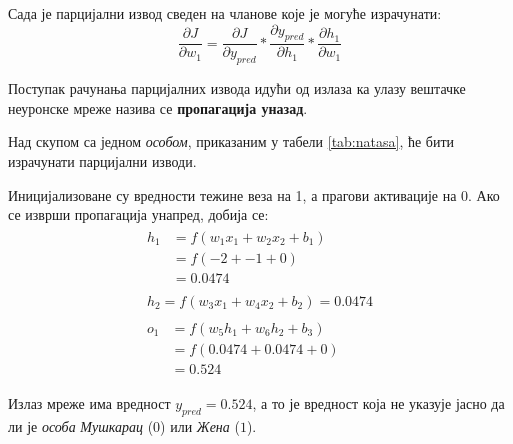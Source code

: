 \documentclass[12pt, а4paper]{article}
\begin{document}
Сада је парцијални извод сведен на чланове које је могуће израчунати:
\begin{equation}
\frac{\partial J}{\partial w_1} = \frac{\partial J}{\partial y_{pred}} * \frac{\partial y_{pred}}{\partial h_1} * \frac{\partial h_1}{\partial w_1}
\end{equation}

Поступак рачунања парцијалних извода идући од излаза ка улазу
вештачке неуронске мреже
назива се \textbf{пропагација уназад}.

Над скупом са једном \textit{особом}, приказаним у табели \ref{tab:natasa},
ће бити израчунати парцијални изводи.

Иницијализоване су вредности тежине веза на 1, а прагови активације на 0. Ако
се изврши пропагација унапред, добија се:
\begin{equation}
\begin{gathered}
\begin{split}
h_1 & = f(w_1 x_1 + w_2 x_2 + b_1) \\
& = f(-2 + -1 + 0) \\
& = 0.0474
\end{split}\\

\begin{split}
h_2 = f(w_3 x_1 + w_4 x_2 + b_2) = 0.0474
\end{split}\\

\begin{split}
o_1 & = f(w_5 h_1 + w_6 h_2 + b_3) \\
& = f(0.0474 + 0.0474 + 0) \\
& = 0.524
\end{split}
\end{gathered}
\end{equation}

Излаз мреже има вредност $y_{pred}=0.524$, а то је вредност која
не указује јасно да ли је \textit{особа} \textit{Мушкарац} ($0$)
или \textit{Жена} ($1$).
\end{document}

